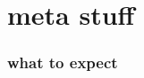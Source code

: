 \documentclass[presentation]{subfiles}
\begin{document}
\section{meta stuff}

\begin{frame}[t]\frametitle{what to expect}
\end{frame}
\end{document}
